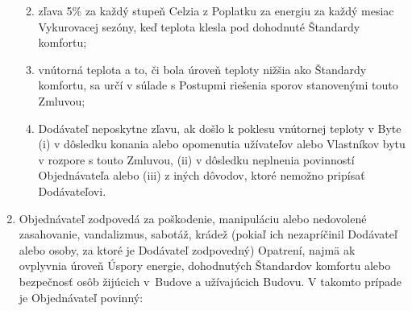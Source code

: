 \begin{multicols}{2}
\begin{enumerate}
  \begin{enumerate}
  \def\labelenumii{\arabic{enumii}.}
  \item
    zľava 5\% za každý stupeň Celzia z Poplatku za energiu za každý
    mesiac Vykurovacej sezóny, keď teplota klesla pod dohodnuté
    Štandardy komfortu;
  \item
    vnútorná teplota a to, či bola úroveň teploty nižšia ako Štandardy
    komfortu, sa určí v súlade s Postupmi riešenia sporov stanovenými
    touto Zmluvou;
  \item
    Dodávateľ neposkytne zľavu, ak došlo k poklesu vnútornej teploty v
    Byte (i) v dôsledku konania alebo opomenutia užívateľov alebo
    Vlastníkov bytu v rozpore s touto Zmluvou, (ii) v dôsledku neplnenia
    povinností Objednávateľa alebo (iii) z iných dôvodov, ktoré nemožno
    pripísať Dodávateľovi.
  \end{enumerate}
\item
  Objednávateľ zodpovedá za poškodenie, manipuláciu alebo nedovolené
  zasahovanie, vandalizmus, sabotáž, krádež (pokiaľ ich nezapríčinil
  Dodávateľ alebo osoby, za ktoré je Dodávateľ zodpovedný) Opatrení,
  najmä ak ovplyvnia úroveň Úspory energie, dohodnutých Štandardov
  komfortu alebo bezpečnosť osôb žijúcich v~Budove a užívajúcich Budovu.
  V takomto prípade je Objednávateľ povinný:


\end{enumerate}
\end{multicols}
